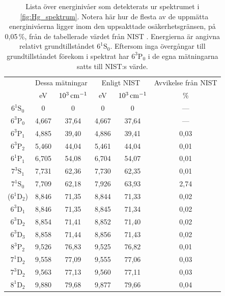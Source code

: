\documentclass[11pt,a4paper]{article}
\newcommand{\figref}{\figurename~\ref}
\begin{document}
\begin{table}
\centering
\caption{Lista över energinivåer som detekterats ur spektrumet i
  \figref{fig:Hg_spektrum}. Notera här hur de flesta av de uppmätta
  energinivåerna ligger inom den uppsakttade osäkerhetsgränsen, på
  0,05\,\%, från de tabellerade värdet från NIST
  \cite{NIST_levels}. Energierna är angivna relativt grundtillståndet
  $6^1\mathrm{S}_0$. Eftersom inga övergångar till grundtillståndet
  förekom i spektrat har $6^3\mathrm{P}_0$ i de egna mätningarna satts
  till NIST:s värde. } 
\label{tab:Hg_nivaer}
\begin{tabular}{|c||c|c|c|c|c|}\cline{2-6}
\multicolumn{1}{c|}{} &
\multicolumn{2}{|c|}{Dessa mätningar} & 
\multicolumn{2}{|c|}{Enligt NIST\cite{NIST_levels}} 
& Avvikelse från NIST
\\ \cline{2-6}
\multicolumn{1}{c|}{} &
\unit{eV} 
& $\unit[10^3]{cm^{-1}}$ &\unit{eV} 
& $\unit[10^3]{cm^{-1}}$
& \%
\\ \hline
$6^1\mathrm{S}_0$ &0 & 0 & 0 & 0 & ---
\\ \hline
$6^3\mathrm{P}_0$ &4,667 & 37,64 & 4,667 & 37,64 & --- \\ \hline 
$6^3\mathrm{P}_1$ &4,885 & 39,40 & 4,886 & 39,41 & 0,03 \\ \hline 
$6^3\mathrm{P}_2$ &5,460 & 44,04 & 5,461 & 44,04 & 0,01 \\ \hline 
$6^1\mathrm{P}_1$ &6,705 & 54,08 & 6,704 & 54,07 & 0,01 \\ \hline 
$7^3\mathrm{S}_1$ &7,731 & 62,36 & 7,730 & 62,35 & 0,01 \\ \hline 
$7^1\mathrm{S}_0$ &7,709 & 62,18 & 7,926 & 63,93 & 2,74 \\ \hline 
($6^1\mathrm{D}_2$) &8,846 & 71,35 & 8,844 & 71,33 & 0,02 \\ \hline 
$6^3\mathrm{D}_1$ &8,846 & 71,35 & 8,845 & 71,34 & 0,02 \\ \hline 
$6^3\mathrm{D}_2$ &8,854 & 71,41 & 8,852 & 71,40 & 0,02 \\ \hline 
$6^3\mathrm{D}_3$ &8,858 & 71,44 & 8,856 & 71,43 & 0,02 \\ \hline 
$8^3\mathrm{P}_2$ &9,526 & 76,83 & 9,525 & 76,82 & 0,01 \\ \hline 
$7^1\mathrm{D}_2$ &9,558 & 77,09 & 9,555 & 77,06 & 0,03 \\ \hline 
$7^3\mathrm{D}_2$ &9,563 & 77,13 & 9,560 & 77,11 & 0,03 \\ \hline 
$8^1\mathrm{D}_2$ &9,880 & 79,68 & 9,877 & 79,66 & 0,04 \\ \hline 
\end{tabular}
\end{table}
\end{document}
